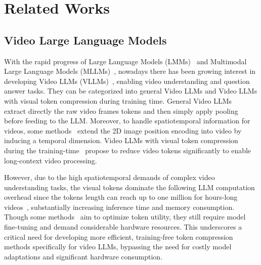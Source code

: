 \section{Related Works}
\label{sec:relatedworks}

\subsection{Video Large Language Models}

With the rapid progress of Large Language Models (LMMs)~\cite{achiam2023gpt,chiang2023vicuna,taori2023stanford} and Multimodal Large Language Models (MLLMs)~\cite{alayrac2022flamingo,li2023blip,liu2024improved,liu2024llavanext,team2023gemini,bai2025qwen2,zhu2025internvl3,zhang2025omnicharacter,zhang2025text}, nowadays there has been growing interest in developing Video LLMs (VLLMs)~\cite{bai2025qwen2,zhu2025internvl3,zhang2023video,lin2023video,cheng2024videollama,li2024mvbench,weng2024longvlm,wu2023visual,wang2023chatvideo,li2023videochat,zeng2022video,chen2024sharegpt4video}, enabling video understanding and question answer tasks. They can be categorized into general Video LLMs and Video LLMs with visual token compression during training time. General Video LLMs~\cite{lin2023video,li2024llava,an2025llava,zhang2024video,cheng2024videollama,bai2025qwen2,zhu2025internvl3} extract directly the raw video frames tokens and then simply apply pooling before feeding to the LLM. Moreover, to handle spatiotemporal information for videos, some methods~\cite{bai2025qwen2,zhang2024video} extend the 2D image position encoding into video by inducing a temporal dimension. Video LLMs with visual token compression during the training-time~\cite{xu2024pllava,maaz2023video,jin2024chat,shen2024longvu,zohar2025apollo,li2024llama} propose to reduce video tokens significantly to enable long-context video processing. 



However, due to the high spatiotemporal demands of complex video understanding tasks, the visual tokens dominate the following LLM computation overhead since the tokens length can reach up to one million for hours-long videos~\cite{team2024gemini}, substantially increasing inference time and memory consumption. Though some methods~\cite{lin2024vila,liu2025nvila} aim to optimize token utility, they still require model fine-tuning and demand considerable hardware resources. This underscores a critical need for developing more efficient, training-free token compression methods specifically for video LLMs, bypassing the need for costly model adaptations and significant hardware consumption.

